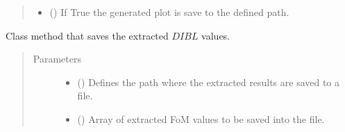 \documentclass[letterpaper,10pt,english,openany, oneside]{sphinxmanual}
\begin{document}
\begin{fulllineitems}
\begin{fulllineitems}
\begin{quote}
\begin{description}
\begin{itemize}
\item {} 
 () \textendash{} If True the generated plot is save to the defined path.

\end{itemize}

\end{description}\end{quote}

\end{fulllineitems}


\begin{fulllineitems}
\label{\detokenize{index:fompy.fom.dibl_ext.save_results_to_file}}
Class method that saves the extracted \(DIBL\) values.
\begin{quote}\begin{description}
\item[{Parameters}] \leavevmode\begin{itemize}
\item {} 
 () \textendash{} Defines the path where the extracted results are saved to a file.

\item {} 
 () \textendash{} Array of extracted FoM values to be saved into the file.

\end{itemize}

\end{description}\end{quote}

\end{fulllineitems}


\end{fulllineitems}

\end{document}
